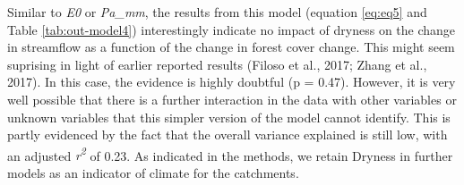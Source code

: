 \documentclass[]{elsarticle} %
\begin{document}
Similar to \emph{E0} or \emph{Pa\_mm}, the results from this model (equation \eqref{eq:eq5} and Table \ref{tab:out-model4}) interestingly indicate no impact of dryness on the change in streamflow as a function of the change in forest cover change. This might seem suprising in light of earlier reported results (Filoso et al., 2017; Zhang et al., 2017). In this case, the evidence is highly doubtful (p = 0.47). However, it is very well possible that there is a further interaction in the data with other variables or unknown variables that this simpler version of the model cannot identify. This is partly evidenced by the fact that the overall variance explained is still low, with an adjusted \emph{r\textsuperscript{2}} of 0.23. As indicated in the methods, we retain Dryness in further models as an indicator of climate for the catchments.
\end{document}
